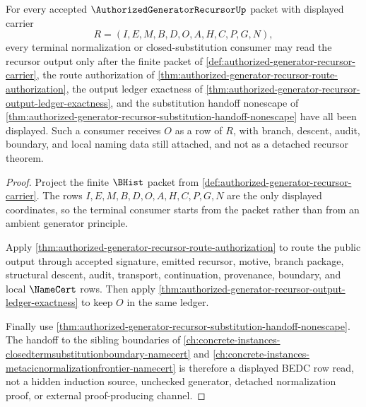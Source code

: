 \begin{theorem}
\label{thm:authorized-generator-recursor-terminal-consumer-readiness}
For every accepted $\AuthorizedGeneratorRecursorUp$ packet with displayed carrier
$$
R=(I,E,M,B,D,O,A,H,C,P,G,N),
$$
every terminal normalization or closed-substitution consumer may read the recursor output only after the finite packet of \autoref{def:authorized-generator-recursor-carrier}, the route authorization of \autoref{thm:authorized-generator-recursor-route-authorization}, the output ledger exactness of \autoref{thm:authorized-generator-recursor-output-ledger-exactness}, and the substitution handoff nonescape of \autoref{thm:authorized-generator-recursor-substitution-handoff-nonescape} have all been displayed. Such a consumer receives $O$ as a row of $R$, with branch, descent, audit, boundary, and local naming data still attached, and not as a detached recursor theorem.
\end{theorem}
\begin{proof}
Project the finite $\BHist$ packet from \autoref{def:authorized-generator-recursor-carrier}. The rows $I,E,M,B,D,O,A,H,C,P,G,N$ are the only displayed coordinates, so the terminal consumer starts from the packet rather than from an ambient generator principle.

Apply \autoref{thm:authorized-generator-recursor-route-authorization} to route the public output through accepted signature, emitted recursor, motive, branch package, structural descent, audit, transport, continuation, provenance, boundary, and local $\NameCert$ rows. Then apply \autoref{thm:authorized-generator-recursor-output-ledger-exactness} to keep $O$ in the same ledger.

Finally use \autoref{thm:authorized-generator-recursor-substitution-handoff-nonescape}. The handoff to the sibling boundaries of \autoref{ch:concrete-instances-closedtermsubstitutionboundary-namecert} and \autoref{ch:concrete-instances-metacicnormalizationfrontier-namecert} is therefore a displayed BEDC row read, not a hidden induction source, unchecked generator, detached normalization proof, or external proof-producing channel.
\end{proof}

